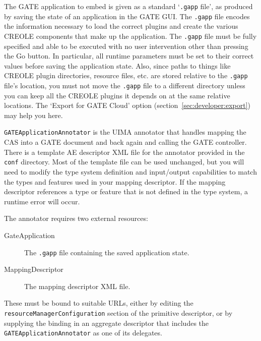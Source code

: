 
The GATE application to embed is given as a standard `\texttt{.gapp} file',
as produced by saving the state of an application in the GATE GUI.  The
\texttt{.gapp} file encodes the information necessary to load the correct
plugins and create the various CREOLE components that make up the application.
The \texttt{.gapp} file must be fully specified and able to be executed with no
user intervention other than pressing the Go button.  In particular, all
runtime parameters must be set to their correct values before saving the
application state.  Also, since paths to things like CREOLE plugin directories,
resource files, etc. are stored relative to the \texttt{.gapp} file's location,
you must not move the \texttt{.gapp} file to a different directory unless you
can keep all the CREOLE plugins it depends on at the same relative locations.
The `Export for GATE Cloud' option (section~\ref{sec:developer:export}) may
help you here.


\texttt{GATEApplicationAnnotator} is the UIMA annotator that handles mapping
the CAS into a GATE document and back again and calling the GATE controller.
There is a template AE descriptor XML file for the annotator provided in the
\texttt{conf} directory.  Most of the template file can be used unchanged, but
you will need to modify the type system definition and input/output
capabilities to match the types and features used in your mapping descriptor.
If the mapping descriptor references a type or feature that is not defined in
the type system, a runtime error will occur.

The annotator requires two external resources:
\begin{description}
\item[GateApplication] The \texttt{.gapp} file containing the saved application
state.
\item[MappingDescriptor] The mapping descriptor XML file.
\end{description}
%
These must be bound to suitable URLs, either by editing the
\texttt{resourceManagerConfiguration} section of the primitive descriptor, or by
supplying the binding in an aggregate descriptor that includes the
\texttt{GATEApplicationAnnotator} as one of its delegates.

